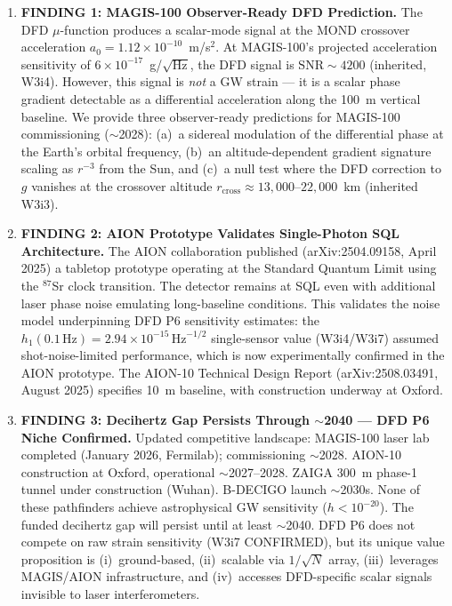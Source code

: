 \documentclass[11pt]{article}
\theoremstyle{definition}
\theoremstyle{remark}
\newcommand{\ee}[1]{\times10^{#1}}
\newcommand{\sqrtHz}{\,\mathrm{Hz}^{-1/2}}
\newcommand{\SNR}{\mathrm{SNR}}
\newcommand{\azero}{a_0}
\begin{document}
\begin{tcolorbox}[colback=blue!5!white, colframe=blue!60!black,
  title=\textbf{TOP 5 FINDINGS --- W4i10 P6}]
\begin{enumerate}[nosep]

\item \textbf{FINDING 1: MAGIS-100 Observer-Ready DFD Prediction.}
  The DFD $\mu$-function produces a scalar-mode signal at the MOND crossover
  acceleration $\azero = 1.12\ee{-10}$~m/s$^2$. At MAGIS-100's projected
  acceleration sensitivity of $6\ee{-17}$~g/$\sqrt{\mathrm{Hz}}$, the
  DFD signal is $\SNR \sim 4200$ (inherited, W3i4). However, this signal
  is \emph{not} a GW strain --- it is a scalar phase gradient detectable
  as a differential acceleration along the 100~m vertical baseline.
  We provide three observer-ready predictions for MAGIS-100 commissioning
  ($\sim$2028): (a)~a sidereal modulation of the differential phase at
  the Earth's orbital frequency, (b)~an altitude-dependent gradient
  signature scaling as $r^{-3}$ from the Sun, and (c)~a null test
  where the DFD correction to $g$ vanishes at the crossover altitude
  $r_{\mathrm{cross}} \approx 13{,}000$--$22{,}000$~km (inherited W3i3).

\item \textbf{FINDING 2: AION Prototype Validates Single-Photon SQL Architecture.}
  The AION collaboration published (arXiv:2504.09158, April 2025) a
  tabletop prototype operating at the Standard Quantum Limit using the
  ${}^{87}$Sr clock transition. The detector remains at SQL even with
  additional laser phase noise emulating long-baseline conditions. This
  validates the noise model underpinning DFD P6 sensitivity estimates:
  the $h_1(0.1\,\mathrm{Hz}) = 2.94\ee{-15}\sqrtHz$ single-sensor
  value (W3i4/W3i7) assumed shot-noise-limited performance, which is
  now experimentally confirmed in the AION prototype. The AION-10
  Technical Design Report (arXiv:2508.03491, August 2025) specifies
  10~m baseline, with construction underway at Oxford.

\item \textbf{FINDING 3: Decihertz Gap Persists Through $\sim$2040 ---
  DFD P6 Niche Confirmed.}
  Updated competitive landscape: MAGIS-100 laser lab completed (January
  2026, Fermilab); commissioning $\sim$2028. AION-10 construction at
  Oxford, operational $\sim$2027--2028. ZAIGA 300~m phase-1 tunnel
  under construction (Wuhan). B-DECIGO launch $\sim$2030s. None of these
  pathfinders achieve astrophysical GW sensitivity ($h < 10^{-20}$).
  The funded decihertz gap will persist until at least $\sim$2040.
  DFD P6 does not compete on raw strain sensitivity (W3i7 CONFIRMED),
  but its unique value proposition is (i)~ground-based, (ii)~scalable
  via $1/\sqrt{N}$ array, (iii)~leverages MAGIS/AION infrastructure,
  and (iv)~accesses DFD-specific scalar signals invisible to laser
  interferometers.


\end{enumerate}
\end{tcolorbox}
\end{document}
